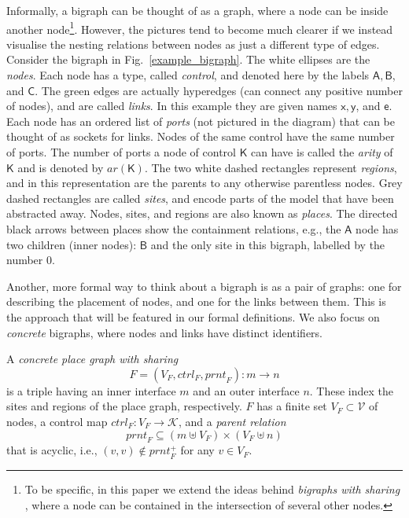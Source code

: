 \documentclass[runningheads]{llncs}
\newcommand\ctrl{\mathit{ctrl}}
\newcommand\prnt{\mathit{prnt}}
\newcommand\ar{\mathit{ar}}
\begin{document}
Informally, a bigraph can be thought of as a graph, where a node can be inside
another node\footnote{To be specific, in this paper we extend the ideas behind
  \emph{bigraphs with sharing}
  \cite{DBLP:phd/ethos/Sevegnani12,dblp:journals/tcs/sevegnanic15}, where a node
  can be contained in the intersection of several other nodes.}. However, the
pictures tend to become much clearer if we instead visualise the nesting
relations between nodes as just a different type of edges. Consider the bigraph
in Fig.~\ref{example_bigraph}. The white ellipses are the \emph{nodes}. Each
node has a type, called \emph{control}, and denoted here by the labels
$\mathsf{A}, \mathsf{B}$, and $\mathsf{C}$. The green edges are actually
hyperedges (can connect any positive number of nodes), and are called
\emph{links}. In this example they are given names $\mathsf{x}, \mathsf{y}$, and
$\mathsf{e}$. Each node has an ordered list of \emph{ports} (not pictured in the
diagram) that can be thought of as sockets for links. Nodes of the same control
have the same number of ports. The number of ports a node of control
$\mathsf{K}$ can have is called the \emph{arity} of $\mathsf{K}$ and is denoted
by $\ar(\mathsf{K})$. The two white dashed rectangles represent \emph{regions},
and in this representation are the parents to any otherwise parentless nodes.
Grey dashed rectangles are called \emph{sites}, and encode parts of the model
that have been abstracted away. Nodes, sites, and regions are also known as
\emph{places}. The directed black arrows between places show the containment
relations, e.g., the $\mathsf{A}$ node has two children (inner nodes):
$\mathsf{B}$ and the only site in this bigraph, labelled by the number $0$.

Another, more formal way to think about a bigraph is as a pair of graphs: one
for describing the placement of nodes, and one for the links between them. This
is the approach that will be featured in our formal definitions. We also focus
on \emph{concrete} bigraphs, where nodes and links have distinct identifiers.

\begin{definition}
  A \emph{concrete place graph with sharing}
  \[ F = (V_F, \ctrl_F, \prnt_F) : m \to n \]
  is a triple having an inner interface $m$ and an outer interface $n$. These
  index the sites and regions of the place graph, respectively. $F$ has a finite
  set $V_F \subset \mathcal{V}$ of nodes, a control map $\ctrl_F : V_F \to
  \mathcal{K}$, and a \emph{parent relation}
  \[ \prnt_F \subseteq (m \uplus V_F) \times (V_F \uplus n) \]
  that is acyclic, i.e., $(v, v) \not\in \prnt_F^+$ for any $v \in V_F$.
\end{definition}
\end{document}
